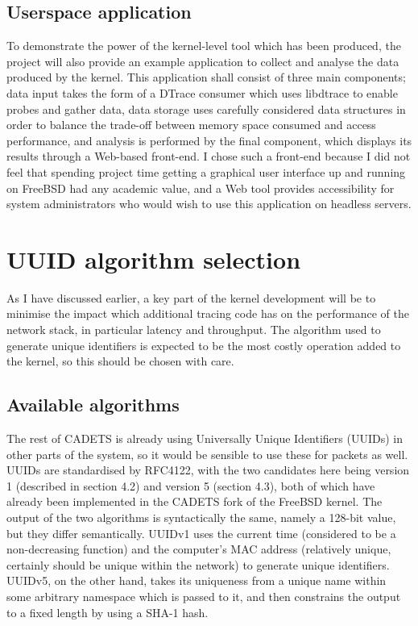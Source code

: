 \documentclass[a4paper,12pt,twoside,openright]{report}
\begin{document}
	\subsection{Userspace application}
	
	To demonstrate the power of the kernel-level tool which has been produced, the project will also provide an example application to collect and analyse the data produced by the kernel. This application shall consist of three main components; data input takes the form of a DTrace consumer which uses libdtrace to enable probes and gather data, data storage uses carefully considered data structures in order to balance the trade-off between memory space consumed and access performance, and analysis is performed by the final component, which displays its results through a Web-based front-end. I chose such a front-end because I did not feel that spending project time getting a graphical user interface up and running on FreeBSD had any academic value, and a Web tool provides accessibility for system administrators who would wish to use this application on headless servers.
	
	\section{UUID algorithm selection}
	
	As I have discussed earlier, a key part of the kernel development will be to minimise the impact which additional tracing code has on the performance of the network stack, in particular latency and throughput. The algorithm used to generate unique identifiers is expected to be the most costly operation added to the kernel, so this should be chosen with care.
	
	\subsection{Available algorithms}
	
	The rest of CADETS is already using Universally Unique Identifiers (UUIDs) in other parts of the system, so it would be sensible to use these for packets as well. UUIDs are standardised by RFC4122\cite{RFC4122}, with the two candidates here being version 1 (described in section 4.2) and version 5 (section 4.3), both of which have already been implemented in the CADETS fork of the FreeBSD kernel. The output of the two algorithms is syntactically the same, namely a 128-bit value, but they differ semantically. UUIDv1 uses the current time (considered to be a non-decreasing function) and the computer's MAC address (relatively unique, certainly should be unique within the network) to generate unique identifiers. UUIDv5, on the other hand, takes its uniqueness from a unique name within some arbitrary namespace which is passed to it, and then constrains the output to a fixed length by using a SHA-1 hash.
	
\end{document}
